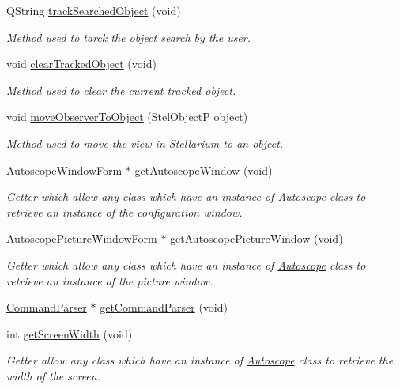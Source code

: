 \begin{DoxyCompactItemize}
Q\+String \hyperlink{class_autoscope_ac5a2819eb2d6971becc544d9f7136b79}{track\+Searched\+Object} (void)
\begin{DoxyCompactList}\small\item\em Method used to tarck the object search by the user. \end{DoxyCompactList}\item 
void \hyperlink{class_autoscope_a2bf2306aa6d3f37dadd83e6e00a35ff3}{clear\+Tracked\+Object} (void)
\begin{DoxyCompactList}\small\item\em Method used to clear the current tracked object. \end{DoxyCompactList}\item 
void \hyperlink{class_autoscope_ac8f9e09385739a5ba5ed460c83ec88df}{move\+Observer\+To\+Object} (Stel\+ObjectP object)
\begin{DoxyCompactList}\small\item\em Method used to move the view in Stellarium to an object. \end{DoxyCompactList}\item 
\hyperlink{class_autoscope_window_form}{Autoscope\+Window\+Form} $\ast$ \hyperlink{class_autoscope_aad8f888c886f1f3e36878e8c3e658813}{get\+Autoscope\+Window} (void)
\begin{DoxyCompactList}\small\item\em Getter which allow any class which have an instance of \hyperlink{class_autoscope}{Autoscope} class to retrieve an instance of the configuration window. \end{DoxyCompactList}\item 
\hyperlink{class_autoscope_picture_window_form}{Autoscope\+Picture\+Window\+Form} $\ast$ \hyperlink{class_autoscope_a78d970ac013a0640bc28cac027737848}{get\+Autoscope\+Picture\+Window} (void)
\begin{DoxyCompactList}\small\item\em Getter which allow any class which have an instance of \hyperlink{class_autoscope}{Autoscope} class to retrieve an instance of the picture window. \end{DoxyCompactList}\item 
\hyperlink{class_command_parser}{Command\+Parser} $\ast$ \hyperlink{class_autoscope_a1be145363f86657b59c6b0cba1497970}{get\+Command\+Parser} (void)
\item 
int \hyperlink{class_autoscope_a0e438a40043c916a7f0f98a30221de11}{get\+Screen\+Width} (void)
\begin{DoxyCompactList}\small\item\em Getter allow any class which have an instance of \hyperlink{class_autoscope}{Autoscope} class to retrieve the width of the screen. \end{DoxyCompactList}\item 

\end{DoxyCompactItemize}
